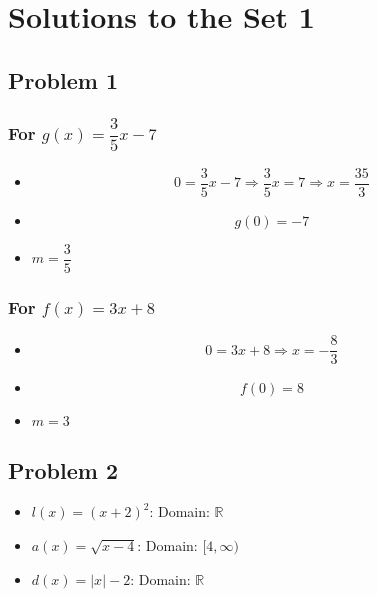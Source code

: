 \documentclass[12pt]{article}
\begin{document}
\newpage
\section*{Solutions to the Set 1}
\subsection*{Problem 1}
\subsubsection*{For \( g(x) = \dfrac{3}{5}x - 7 \)}

\begin{itemize}
    \item {}
    \[
    0 = \dfrac{3}{5}x - 7 \Rightarrow \dfrac{3}{5}x = 7 \Rightarrow x = \dfrac{35}{3}
    \]
    
    \item {}
    \[
    g(0) = -7
    \]
    
    \item {} \( m = \dfrac{3}{5} \)
\end{itemize}

\subsubsection*{For \( f(x) = 3x + 8 \)}

\begin{itemize}
    \item {}
    \[
    0 = 3x + 8 \Rightarrow x = -\dfrac{8}{3}
    \]
    
    \item {}
    \[
    f(0) = 8
    \]
    
    \item {} \( m = 3 \)
\end{itemize}
\subsection*{Problem 2}
\begin{itemize}
    \item \( l(x) = (x+2)^2 \): Domain: \( \mathbb{R} \)
    \item \( a(x) = \sqrt{x-4} \): Domain: \( [4, \infty) \)
    \item \( d(x) = |x| - 2 \): Domain: \( \mathbb{R} \)
\end{itemize}
\end{document}
